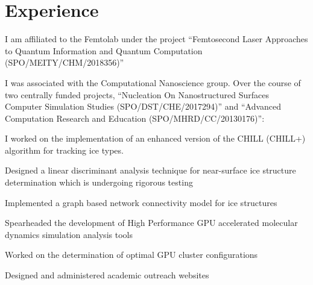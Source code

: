 \documentclass[letterpaper]{deedy-resume} %
\begin{document}
\begin{minipage}[t]{0.63\textwidth} %


	\section{Experience}


	\vspace{\topsep} %
	I am affiliated to the Femtolab under the project ``Femtosecond Laser Approaches to Quantum Information and Quantum Computation (SPO/MEITY/CHM/2018356)''

	\sectionspace %



	\vspace{\topsep} %
	I was associated with the Computational Nanoscience group. Over the course of two centrally funded projects, ``Nucleation On Nanostructured Surfaces Computer Simulation      Studies (SPO/DST/CHE/2017294)'' and ``Advanced Computation Research and Education (SPO/MHRD/CC/20130176)'':
	\vspace{\topsep} %
	\begin{tightitemize}
		\item I worked on the
		implementation of an enhanced version of the CHILL (CHILL+) algorithm for tracking
		ice types.
		\item Designed a linear discriminant analysis technique for near-surface ice structure determination which is undergoing rigorous testing
		\item Implemented a graph based network connectivity model for ice structures
		\item Spearheaded the development of High Performance GPU accelerated molecular dynamics simulation analysis tools
		\item Worked on the determination of optimal GPU cluster configurations
		\item Designed and administered academic outreach websites
	\end{tightitemize}




\end{minipage}
\end{document}
